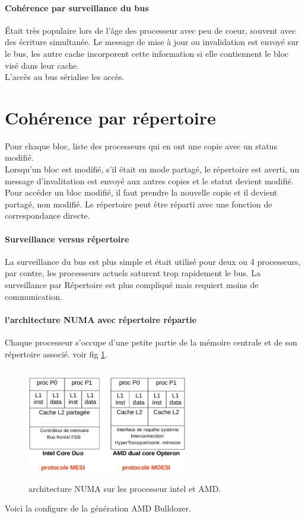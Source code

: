\documentclass[oneside]{book}
\begin{document}
\paragraph{Cohérence par surveillance du bus} Était très populaire lors de l'âge des processeur avec peu de coeur, souvent avec des écriture simultanée. Le message de mise à jour ou invalidation est envoyé sur le bus, les autre cache incorporent cette information si elle contiennent le bloc visé dans leur cache.\\

L'accès au bus sérialise les accès.
\section{Cohérence par répertoire}
Pour chaque bloc, liste des processeurs qui en ont une copie avec un status modifié. \\
Lorsqu'un bloc est modifié, s'il était en mode partagé, le
répertoire est averti, un message d'invalitation est envoyé
aux autres copies et le statut devient modifié.\\

Pour accéder un bloc modifié, il faut prendre la nouvelle
copie et il devient partagé, non modifié. Le répertoire peut être réparti avec une fonction de
correspondance directe.
\paragraph{Surveillance versus répertoire}
La surveillance du bus est plus simple et était utilisé pour deux ou 4 processeurs, par contre, les processeurs actuels saturent trop rapidement le bus. La surveillance par Répertoire est plus compliqué mais requiert moins de communication.

\paragraph{l'architecture NUMA avec répertoire répartie}
Chaque processeur s'occupe d'une petite partie de la mémoire centrale et de son répertoire associé. voir fig \ref{fig:numa}.

\begin{figure}[!ht]
\centering
\includegraphics[height = 5cm, width = 7cm, keepaspectratio]{NUMA.png}
\caption{architecture NUMA sur les processeur intel et AMD.}
\label{fig:numa}
\end{figure}
Voici la configure de la génération AMD Bulldozer.
\end{document}
